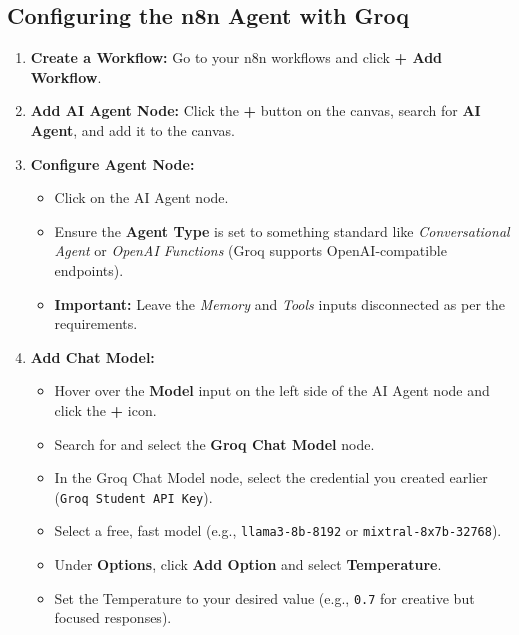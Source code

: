 \documentclass[12pt,a4paper]{article}
\begin{document}
\subsection{Configuring the n8n Agent with Groq}
\begin{enumerate}[label=\textbf{Step \arabic*.}]
    \item \textbf{Create a Workflow:} Go to your n8n workflows and click \textbf{+ Add Workflow}.
    \item \textbf{Add AI Agent Node:} Click the \textbf{+} button on the canvas, search for \textbf{AI Agent}, and add it to the canvas.
    \item \textbf{Configure Agent Node:} 
    \begin{itemize}
        \item Click on the AI Agent node.
        \item Ensure the \textbf{Agent Type} is set to something standard like \textit{Conversational Agent} or \textit{OpenAI Functions} (Groq supports OpenAI-compatible endpoints).
        \item \textbf{Important:} Leave the \textit{Memory} and \textit{Tools} inputs disconnected as per the requirements.
    \end{itemize}
    \item \textbf{Add Chat Model:}
    \begin{itemize}
        \item Hover over the \textbf{Model} input on the left side of the AI Agent node and click the \textbf{+} icon.
        \item Search for and select the \textbf{Groq Chat Model} node.
        \item In the Groq Chat Model node, select the credential you created earlier (\texttt{Groq Student API Key}).
        \item Select a free, fast model (e.g., \texttt{llama3-8b-8192} or \texttt{mixtral-8x7b-32768}).
        \item Under \textbf{Options}, click \textbf{Add Option} and select \textbf{Temperature}.
        \item Set the Temperature to your desired value (e.g., \texttt{0.7} for creative but focused responses).
    \end{itemize}
\end{enumerate}
\end{document}
